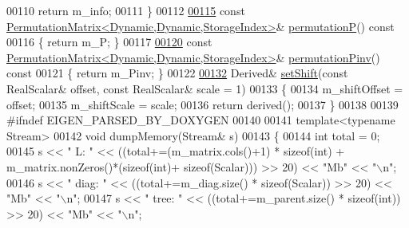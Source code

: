 \begin{DoxyCode}
00110       \textcolor{keywordflow}{return} m\_info;
00111     \}
00112     
\hyperlink{group___sparse_cholesky___module_aff1480e595a21726beaec9a586a94d5a}{00115}     \textcolor{keyword}{const} \hyperlink{group___core___module}{PermutationMatrix<Dynamic,Dynamic,StorageIndex>}& 
      \hyperlink{group___sparse_cholesky___module_aff1480e595a21726beaec9a586a94d5a}{permutationP}()\textcolor{keyword}{ const}
00116 \textcolor{keyword}{    }\{ \textcolor{keywordflow}{return} m\_P; \}
00117     
\hyperlink{group___sparse_cholesky___module_a0e23d1f4a88c211be7098faf1cb41674}{00120}     \textcolor{keyword}{const} \hyperlink{group___core___module}{PermutationMatrix<Dynamic,Dynamic,StorageIndex>}& 
      \hyperlink{group___sparse_cholesky___module_a0e23d1f4a88c211be7098faf1cb41674}{permutationPinv}()\textcolor{keyword}{ const}
00121 \textcolor{keyword}{    }\{ \textcolor{keywordflow}{return} m\_Pinv; \}
00122 
\hyperlink{group___sparse_cholesky___module_a362352f755101faaac59c1ed9d5e3559}{00132}     Derived& \hyperlink{group___sparse_cholesky___module_a362352f755101faaac59c1ed9d5e3559}{setShift}(\textcolor{keyword}{const} RealScalar& offset, \textcolor{keyword}{const} RealScalar& scale = 1)
00133     \{
00134       m\_shiftOffset = offset;
00135       m\_shiftScale = scale;
00136       \textcolor{keywordflow}{return} derived();
00137     \}
00138 
00139 \textcolor{preprocessor}{#ifndef EIGEN\_PARSED\_BY\_DOXYGEN}
00140 
00141     \textcolor{keyword}{template}<\textcolor{keyword}{typename} Stream>
00142     \textcolor{keywordtype}{void} dumpMemory(Stream& s)
00143     \{
00144       \textcolor{keywordtype}{int} total = 0;
00145       s << \textcolor{stringliteral}{"  L:        "} << ((total+=(m\_matrix.cols()+1) * \textcolor{keyword}{sizeof}(\textcolor{keywordtype}{int}) + m\_matrix.nonZeros()*(\textcolor{keyword}{sizeof}(int)+\textcolor{keyword}{
      sizeof}(Scalar))) >> 20) << \textcolor{stringliteral}{"Mb"} << \textcolor{stringliteral}{"\(\backslash\)n"};
00146       s << \textcolor{stringliteral}{"  diag:     "} << ((total+=m\_diag.size() * \textcolor{keyword}{sizeof}(Scalar)) >> 20) << \textcolor{stringliteral}{"Mb"} << \textcolor{stringliteral}{"\(\backslash\)n"};
00147       s << \textcolor{stringliteral}{"  tree:     "} << ((total+=m\_parent.size() * \textcolor{keyword}{sizeof}(int)) >> 20) << \textcolor{stringliteral}{"Mb"} << \textcolor{stringliteral}{"\(\backslash\)n"};

\end{DoxyCode}

